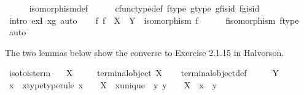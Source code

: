 \begin{isabellebody}
\ \ \ \ \isamarkupfalse%
\ isomorphism{\isacharunderscore}{\kern0pt}def\isanewline
\ \ \ \ \isamarkupfalse%
\ cfunc{\isacharunderscore}{\kern0pt}type{\isacharunderscore}{\kern0pt}def\ f{\isacharunderscore}{\kern0pt}type\ g{\isacharunderscore}{\kern0pt}type\ g{\isacharunderscore}{\kern0pt}f{\isacharunderscore}{\kern0pt}is{\isacharunderscore}{\kern0pt}id\ f{\isacharunderscore}{\kern0pt}g{\isacharunderscore}{\kern0pt}is{\isacharunderscore}{\kern0pt}id\isanewline
\ \ \ \ \isamarkupfalse%
\ {\isacharparenleft}{\kern0pt}intro\ exI{\isacharbrackleft}{\kern0pt}\ x{\isacharequal}{\kern0pt}g{\isacharbrackright}{\kern0pt}{\isacharcomma}{\kern0pt}\ auto{\isacharparenright}{\kern0pt}\isanewline
\isanewline
\ \ \isamarkupfalse%
\ {\isachardoublequoteopen}{\isasymexists}f{\isachardot}{\kern0pt}\ f\ {\isacharcolon}{\kern0pt}\ X\ {\isasymrightarrow}\ Y\ {\isasymand}\ isomorphism\ f{\isachardoublequoteclose}\isanewline
\ \ \ \ \isamarkupfalse%
\ f{\isacharunderscore}{\kern0pt}isomorphism\ f{\isacharunderscore}{\kern0pt}type\ \isamarkupfalse%
\ auto\isanewline
{}\isamarkupfalse%
%
\endisatagproof
{\isafoldproof}%
%
\isadelimproof
%
\endisadelimproof
%
\begin{isamarkuptext}%
The two lemmas below show the converse to Exercise 2.1.15 in Halvorson.%
\end{isamarkuptext}\isamarkuptrue%
\isamarkupfalse%
\ iso{\isacharunderscore}{\kern0pt}to{}{\isacharunderscore}{\kern0pt}is{\isacharunderscore}{\kern0pt}term{\isacharcolon}{\kern0pt}\isanewline
\ \ \ {\isachardoublequoteopen}X\ {\isasymcong}\ {\isasymone}{\isachardoublequoteclose}\isanewline
\ \ \ {\isachardoublequoteopen}terminal{\isacharunderscore}{\kern0pt}object\ X{\isachardoublequoteclose}\isanewline
%
\isadelimproof
\ \ %
\endisadelimproof
%
\isatagproof
{}\isamarkupfalse%
\ terminal{\isacharunderscore}{\kern0pt}object{\isacharunderscore}{\kern0pt}def\isanewline
{}\isamarkupfalse%
\ \isanewline
\ \ \isamarkupfalse%
\ Y\isanewline
\ \ \isamarkupfalse%
\ x\ \ x{\isacharunderscore}{\kern0pt}type{\isacharbrackleft}{\kern0pt}type{\isacharunderscore}{\kern0pt}rule{\isacharbrackright}{\kern0pt}{\isacharcolon}{\kern0pt}\ {\isachardoublequoteopen}x\ {\isacharcolon}{\kern0pt}\ {\isasymone}\ {\isasymrightarrow}\ X{\isachardoublequoteclose}\ \ x{\isacharunderscore}{\kern0pt}unique{\isacharcolon}{\kern0pt}\ {\isachardoublequoteopen}{\isasymforall}\ y{\isachardot}{\kern0pt}\ y\ {\isacharcolon}{\kern0pt}\ {\isasymone}\ {\isasymrightarrow}\ X\ {\isasymlongrightarrow}\ x\ {\isacharequal}{\kern0pt}\ y{\isachardoublequoteclose}\isanewline

\end{isabellebody}
